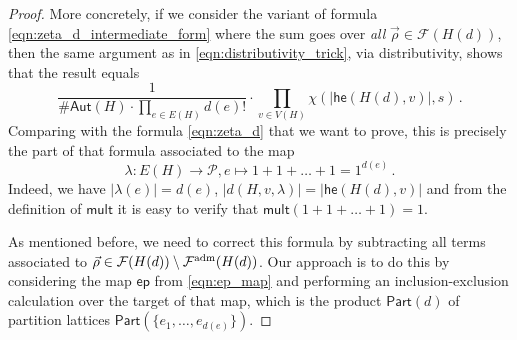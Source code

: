 \documentclass[authorcolumns,numberwithinsect]{no-lipics-v2022}
\newcommand{\he}{\mathsf{he}}
\begin{document}
\begin{proof}
More concretely, if we consider the variant of formula \eqref{eqn:zeta_d_intermediate_form} where the sum goes over \emph{all} $\vec\rho \in \mathcal{F}(H(d))$, then the same argument as in \eqref{eqn:distributivity_trick}, via distributivity, shows that the result equals
\[
\frac{1}{\#\mathsf{Aut}(H) \cdot \prod_{e \in E(H)} d(e)!} \cdot \prod_{v\in V(H)} \chi(|\he(H(d), v)|, s)\,.
\]
Comparing with the formula \eqref{eqn:zeta_d} that we want to prove, this is precisely the part of that formula associated to the map
\[
\lambda : E(H) \to \mathcal{P}, e \mapsto 1 + 1 + \ldots + 1 = 1^{d(e)}\,.
\]
Indeed, we have $|\lambda(e)|=d(e)$, $|d(H,v,\lambda)|=|\he(H(d), v)|$ and from the definition of $\mathsf{mult}$ it is easy to verify that $\mathsf{mult}(1+1+\ldots+1) = 1$. 

As mentioned before, we need to correct this formula by subtracting all terms associated to $\vec\rho \in \mathcal{F}(H(d)) \setminus \mathcal{F}^\textup{adm}(H(d))$. Our approach is to do this by considering the map $\mathsf{ep}$ from \eqref{eqn:ep_map} and performing an inclusion-exclusion calculation over the target of that map, which is the product $\mathsf{Part}(d)$ of partition lattices $\mathsf{Part}(\{e_1, \ldots, e_{d(e)}\})$. 


\end{proof}
\end{document}
